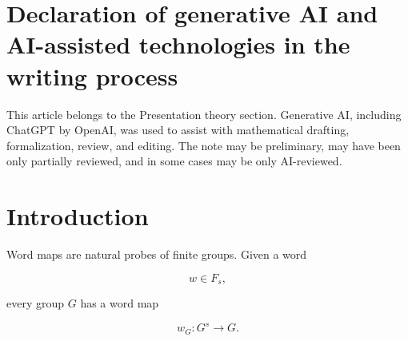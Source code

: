 \documentclass[11pt]{article}
\begin{document}
\begin{abstract}
Thus all Pfaffian representations of $C$ give word-measure twins. The groups are nevertheless non-isomorphic whenever the Pfaffian representations are inequivalent. Using decomposable Pfaffian representations associated with line bundles

\[
L\in\operatorname{Pic}^{g-1}(C),
\qquad
h^0(C,L)=0,
\]

we obtain $\gg_d p^g$ pairwise non-isomorphic examples. We also record a stronger geometric refinement. Over an algebraically closed field, the scalar word-measure profile collapses a whole open subset of the moduli space

\[
M_C(2,K_C),
\]

of dimension (3g-3). Under the standard finite-field rationality hypothesis for this Pfaffian moduli open, the finite-field family can be enlarged to size $\gg_d p^{3g-3}$. The examples have the same hom-counts from every one-relator group, the same untwisted surface-group hom-counts, the same probabilistic identities, the same commutator-factorization profiles, and the same irreducible character-degree zeta function. They are separated by kernel tomography: Kernel-MVMT recovers the projectivized Pfaffian kernel bundle

\[
\mathbb P\mathcal K_M
=\{(x,[v])\in C\times\mathbb P^{2d-1}:M(x)v=0\},
\]

which is invisible to ordinary word-map distributions.
\end{abstract}

\section*{Declaration of generative AI and AI-assisted technologies in the writing process}
This article belongs to the Presentation theory section. Generative AI, including ChatGPT by \mbox{OpenAI}, was used to assist with mathematical drafting, formalization, review, and editing. The note may be preliminary, may have been only partially reviewed, and in some cases may be only AI-reviewed.

\section{Introduction}

Word maps are natural probes of finite groups. Given a word

\[
w\in F_s,
\]

every group $G$ has a word map

\[
w_G:G^s\to G.
\]
\end{document}
